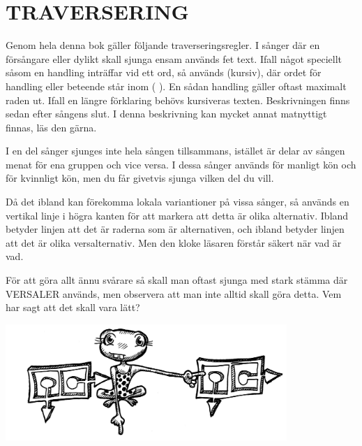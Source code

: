 \documentclass[a6paper,fontsize=10pt,twoside,open=right]{scrbook}
\begin{document}
\section{TRAVERSERING}\vspace{10pt}
Genom hela denna bok gäller följande
traverseringsregler. I sånger där en försångare eller dylikt skall
sjunga ensam används fet text. Ifall något speciellt såsom en handling
inträffar vid ett ord, så används (kursiv), där ordet för handling
eller beteende står inom ( ). En sådan handling gäller oftast maximalt
raden ut. Ifall en längre förklaring behövs kursiveras
texten. Beskrivningen finns sedan efter sångens slut. I denna
beskrivning kan mycket annat matnyttigt finnas, läs den
gärna.

I en del sånger sjunges inte hela sången tillsammans,
istället är delar av sången menat för ena gruppen och vice versa. I
dessa sånger används {\Large\Male} för manligt kön och {\Large\Female}
för kvinnligt kön, men du får givetvis sjunga vilken del du vill.

\begin{leftborder}
  
  \hspace{15pt}Då det ibland kan förekomma lokala variantioner på vissa sånger, så
  används en  vertikal linje i högra kanten för att markera att detta
  är olika alternativ. Ibland betyder linjen att det är raderna som är
  alternativen, och ibland betyder linjen att det är olika
  versalternativ. Men den kloke läsaren förstår säkert när vad är vad.
\end{leftborder}

För att göra allt ännu svårare så skall man oftast sjunga med stark
stämma där VERSALER används, men observera att man inte alltid skall
göra detta. Vem har sagt att det skall vara lätt?
\newpage
\cleardoublepage
\renewcommand{\contentsname}{\vspace{-2.17cm}\rmfamily{\fontsize{13}{15}\textbf{INNEHÅLL}}\vspace{45pt}}
\tableofcontents\par
\begin{center}
  \vspace*{-300pt}
  \noindent\includegraphics[keepaspectratio,width=0.8\textwidth]{elements/groda.jpg}
\end{center}
\renewcommand{\leftmark}{}
\end{document}

